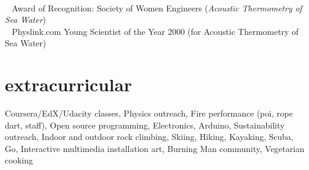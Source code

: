 \documentclass[]{seiler-resume}
\begin{document}
\begin{tabbing}
\\{\textbullet~ Award of Recognition: Society of Women Engineers (\textit{Acoustic Thermometry of Sea Water}) }
\\{\textbullet~ Physlink.com Young Scientist of the Year 2000 (for Acoustic Thermometry of Sea Water)}
\end{tabbing}
\section{extracurricular} {Coursera/EdX/Udacity classes, Physics outreach, Fire performance (poi, rope dart, staff), Open source programming, Electronics, Arduino,
Sustainability outreach, Indoor and outdoor rock climbing, Skiing, Hiking, Kayaking, Scuba, Go, Interactive multimedia installation art, Burning Man community, Vegetarian cooking} 
\end{document}

